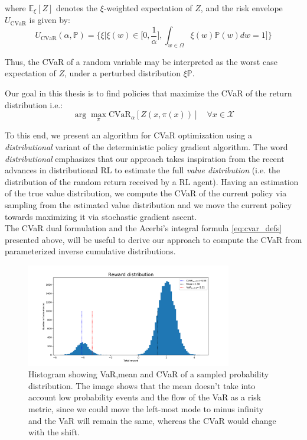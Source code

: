 where $\mathbb E_\xi[Z]$ denotes the $\xi$-weighted expectation of $Z$, and the risk envelope $U_\text{CVaR}$ is
given by:
\begin{equation}
    U_{\text{CVaR}}(\alpha, \mathbb{P}) = \Big\{\xi | \xi(w)  \in \big [ 0, \frac{1}{\alpha} \big ], \int_{w\in\Omega} \xi(w)\mathbb{P}(w)dw=1   \big ] \Big\}
\end{equation}

Thus, the CVaR of a random variable may be interpreted as the worst case expectation of $Z$, under
a perturbed distribution $\xi \mathbb{P}$.

Our goal in this thesis is to find policies that maximize the CVaR of the 
return distribution i.e.:
\begin{equation}
    \arg \underset{\pi}\max \text{CVaR}_\alpha [Z (x, \pi(x))] \quad \forall x \in \mathcal{X}
\end{equation}

To this end, we present an algorithm for CVaR optimization using a \textit{distributional} variant 
of the deterministic policy gradient algorithm.
The word \textit{distributional} emphasizes that our approach takes inspiration from the
recent advances in distributional RL 
\citep{Bellemare2017,Dabney2018a,Dabney2018b} to estimate the full
\textit{value distribution} (i.e. the distribution of the random return received by a RL agent).
Having an estimation of the true value distribution, we compute the CVaR of the current policy
via sampling from the estimated value distribution and we move the current policy
towards maximizing it via stochastic gradient ascent.\\
The CVaR dual formulation and the Acerbi's integral formula \ref{eq:cvar_defs} presented above,
will be useful to derive our approach to compute the CVaR 
from parameterized inverse cumulative distributions.

\begin{figure}[ht]
    \centering
    \includegraphics[width=0.8\textwidth]{images/cvar_motivation2.pdf}
    \caption{Histogram showing VaR,mean and CVaR of a sampled probability distribution.
    The image shows that the mean doesn't take into account low probability events and 
    the flow of
    the VaR as a risk metric, since we could move the left-most mode to minus infinity
    and the VaR will remain the same, whereas the CVaR would change with the shift. }
    \label{cvar_cheetah}

\end{figure}

